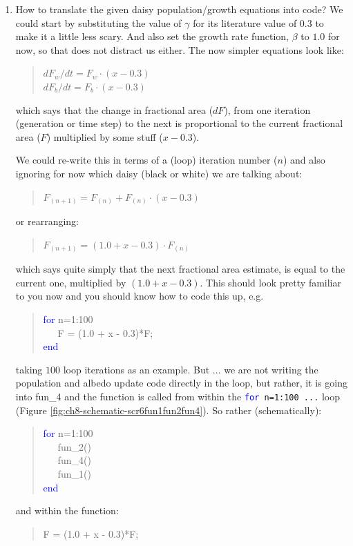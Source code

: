 \documentclass{tufte-book} %
\newenvironment{docspec}{\begin{quotation}\ttfamily\parskip0pt\parindent0pt\ignorespaces}{\end{quotation}}
\begin{document}
\begin{enumerate}
\item How to translate the given daisy population/growth equations into code? We could start by substituting the value of \(\gamma\) for its literature value of \(0.3\) to make it a little less scary. And also set the growth rate function, \(\beta\) to \(1.0\) for now, so that does not distract us either. The now simpler equations look like:
\begin{docspec}
\(dF_{w}/dt = F_{w}\cdot(x-0.3)\)
\\\(dF_{b}/dt = F_{b}\cdot(x-0.3)\)
\end{docspec}
which says that the change in fractional area (\(dF\)), from one iteration (generation or time step) to the next is proportional to the current fractional area (\(F\)) multiplied by some stuff (\(x-0.3\)).

We could re-write this in terms of a (loop) iteration number (\(n\)) and also ignoring for now which daisy (black or white) we are talking about:
\begin{docspec}
\(F_{(n+1)}=F_{(n)} + F_{(n)}\cdot (x-0.3)\)
\end{docspec}
or rearranging:
\begin{docspec}
\(F_{(n+1)}=(1.0 + x-0.3)\cdot F_{(n)}\)
\end{docspec}
which says quite simply that the next fractional area estimate, is equal to the current one, multiplied by \((1.0 + x-0.3)\). This should look pretty familiar to you now and you should know how to code this up, e.g.
\begin{docspec}
\textcolor{blue}{for} n=1:100\\
\ \ \ F = (1.0 + x - 0.3)*F;\\
\textcolor{blue}{end}
\end{docspec}
taking \(100\) loop iterations as an example. But ... we are not writing the population  and albedo update code directly in the loop, but rather, it is going into \textsf{fun\_4} and the function is called from within the \texttt{\textcolor{blue}{for} n=1:100 ...} loop (Figure \ref{fig:ch8-schematic-scr6fun1fun2fun4}).
 So rather (schematically):
\begin{docspec}
\textcolor{blue}{for} n=1:100\\
\ \ \ fun\_2()\\
\ \ \ fun\_4()\\
\ \ \ fun\_1()\\
\textcolor{blue}{end}
\end{docspec}
and within the function:
\begin{docspec}
F = (1.0 + x - 0.3)*F;
\end{docspec}
 

\end{enumerate}
\end{document}
